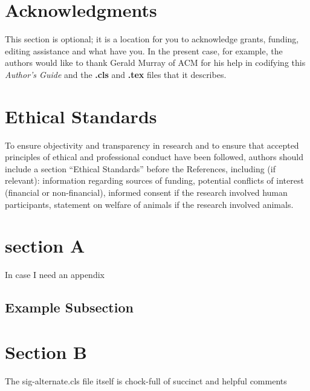 \documentclass{nime-alternate} %
\begin{document}
\section{Acknowledgments}
This section is optional; it is a location for you
to acknowledge grants, funding, editing assistance and
what have you.  In the present case, for example, the
authors would like to thank Gerald Murray of ACM for
his help in codifying this \textit{Author's Guide}
and the \textbf{.cls} and \textbf{.tex} files that it describes.
\section{Ethical Standards}
To ensure objectivity and transparency in research and to ensure that accepted principles of ethical and professional conduct have been followed, authors should include a section “Ethical Standards” before the References, including (if relevant): information regarding sources of funding, potential conflicts of interest (financial or non-financial), informed consent if the research involved human participants, statement on welfare of animals if the research involved animals.

\appendix
\section{section A}
In case I need an appendix
\subsection{Example Subsection}
\section{Section B}
The sig-alternate.cls file itself is chock-full of succinct
and helpful comments


     
\end{document}
